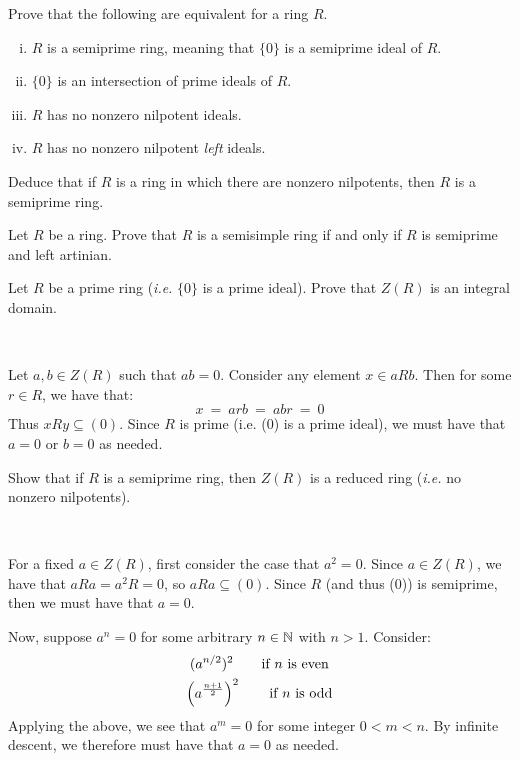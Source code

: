 \nq
\begin{exr}[title=Theorem 10.11] %
	Prove that the following are equivalent for a ring $R$. \vspace{-0.2in}
	\begin{enumerate}[i)]
		\item $R$ is a semiprime ring, meaning that $\{0\}$ is a semiprime ideal of $R$.
		\item $\{0\}$ is an intersection of prime ideals of $R$.
		\item $R$ has no nonzero nilpotent ideals.
		\item $R$ has no nonzero nilpotent \textit{left} ideals.
	\end{enumerate}
	Deduce that if $R$ is a ring in which there are nonzero nilpotents, then $R$ is a \\
	semiprime ring.
\end{exr}


\nq
\begin{exr}[title=Theorem 10.24] %
	Let $R$ be a ring. Prove that $R$ is a semisimple ring if and only if
	$R$ is semiprime and left artinian.
\end{exr}


\nq
\begin{exr}[title=Exercise 10.0]
	Let $R$ be a prime ring (\textit{i.e.} $\{0\}$ is a prime ideal).
	Prove that $Z(R)$ is an integral domain.
\end{exr} \

\begin{pf}
	Let $a,b\in Z(R)$ such that $ab=0$. Consider any element $x\in aRb$.
	Then for some $r\in R$, we have that:
	\begin{equation*}
		x \ = \ arb \ = \ abr \ = \ 0
	\end{equation*}
	Thus $xRy\subseteq(0)$.
	Since $R$ is prime (i.e. (0) is a prime ideal), we must have that $a=0$ or
	$b=0$ as needed.
\end{pf}


\nq
\begin{exr}[title=Exercise 10.1]
	Show that if $R$ is a semiprime ring, then
	$Z(R)$ is a reduced ring (\textit{i.e.} no nonzero nilpotents).
\end{exr} \

\begin{pf}
	For a fixed $a\in Z(R)$, first consider the case that $a^{2}=0$.
	Since $a\in Z(R)$, we have that $aRa = a^{2}R = 0$, so $aRa\subseteq(0)$.
	Since $R$ (and thus (0)) is semiprime, then we must have that $a=0$.

	Now, suppose $a^{n}=0$ for some arbitrary $n \in\mathbb{N}$ with $n>1$. Consider:
	\begin{gather*}
		(a^{n/2})^{2} \qquad \textrm{if } n \textrm{ is even} \\
		\left(a^{\frac{n+1}{2}}\right)^{2} \qquad \textrm{if } n \textrm{ is odd}
	\end{gather*}
	Applying the above, we see that $a^{m}=0$ for some integer $0<m<n$.
	By infinite descent, we therefore must have that $a=0$ as needed.
\end{pf}


